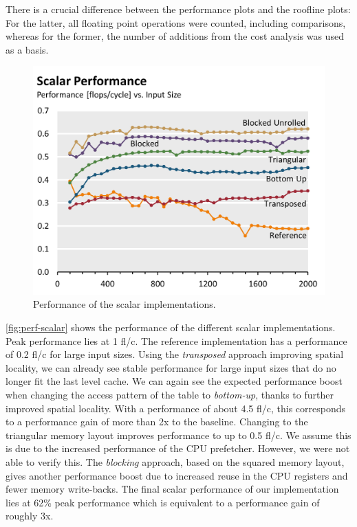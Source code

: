 There is a crucial difference between the performance plots and the roofline
plots: For the latter, all floating point operations were counted, including
comparisons, whereas for the former, the number of additions from the cost
analysis was used as a basis.

\begin{figure}[htb]\centering
  \includegraphics[width=\linewidth]{plot_data/scalar_performance.png}
  \caption{Performance of the scalar implementations.}
  \label{fig:perf-scalar}
\end{figure}
\autoref{fig:perf-scalar} shows the performance of the different scalar
implementations. Peak performance lies at 1 fl/c. The reference
implementation has a performance of 0.2 fl/c for large input sizes. Using
the \emph{transposed} approach improving spatial locality, we can already
see stable performance for large input sizes that do no longer fit the last
level cache. We can again see the expected performance boost when changing
the access pattern of the table to \emph{bottom-up}, thanks to further
improved spatial locality. With a performance of about 4.5 fl/c, this
corresponds to a performance gain of more than 2x to the baseline. Changing
to the triangular memory layout improves performance to up to 0.5 fl/c. We
assume this is due to the increased performance of the CPU prefetcher.
However, we were not able to verify this. The \emph{blocking} approach,
based on the squared memory layout, gives another performance boost due to
increased reuse in the CPU registers and fewer memory write-backs. The
final scalar performance of our implementation lies at 62\% peak
performance which is equivalent to a performance gain of roughly 3x.

